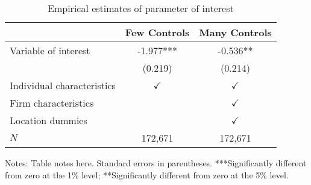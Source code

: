 \documentclass[12pt,english]{article}
\begin{document}
\begin{table}[ht]
\caption{Empirical estimates of parameter of interest}
\label{tab:estimates} 
\centering
\begin{threeparttable}
\begin{tabular}{lcc}
\toprule
                            & Few Controls    & Many Controls \\
\midrule
Variable of interest        & -1.977***       & -0.536**    \\
                            & (0.219)         & (0.214)     \\
Individual characteristics  & $\checkmark$    & $\checkmark$\\
Firm characteristics        &                 & $\checkmark$\\
Location dummies            &                 & $\checkmark$\\
\midrule
$N$                         & 172,671         & 172,671      \\
\bottomrule
\end{tabular}
\footnotesize Notes: Table notes here. Standard errors in parentheses. ***Significantly different from zero at the 1\% level; **Significantly different from zero at the 5\% level.
\end{threeparttable}
\end{table}




\end{document}
